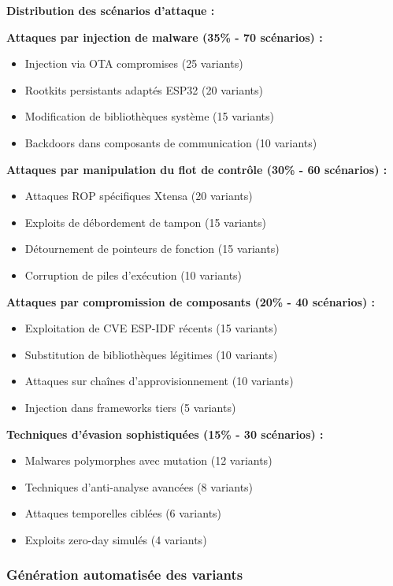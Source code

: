 \textbf{Distribution des scénarios d'attaque :}

\textbf{Attaques par injection de malware (35\% - 70 scénarios) :}
\begin{itemize}
    \item Injection via OTA compromises (25 variants)
    \item Rootkits persistants adaptés ESP32 (20 variants)
    \item Modification de bibliothèques système (15 variants)
    \item Backdoors dans composants de communication (10 variants)
\end{itemize}

\textbf{Attaques par manipulation du flot de contrôle (30\% - 60 scénarios) :}
\begin{itemize}
    \item Attaques ROP spécifiques Xtensa (20 variants)
    \item Exploits de débordement de tampon (15 variants)
    \item Détournement de pointeurs de fonction (15 variants)
    \item Corruption de piles d'exécution (10 variants)
\end{itemize}

\textbf{Attaques par compromission de composants (20\% - 40 scénarios) :}
\begin{itemize}
    \item Exploitation de CVE ESP-IDF récents (15 variants)
    \item Substitution de bibliothèques légitimes (10 variants)
    \item Attaques sur chaînes d'approvisionnement (10 variants)
    \item Injection dans frameworks tiers (5 variants)
\end{itemize}

\textbf{Techniques d'évasion sophistiquées (15\% - 30 scénarios) :}
\begin{itemize}
    \item Malwares polymorphes avec mutation (12 variants)
    \item Techniques d'anti-analyse avancées (8 variants)
    \item Attaques temporelles ciblées (6 variants)
    \item Exploits zero-day simulés (4 variants)
\end{itemize}

\subsubsection{Génération automatisée des variants}

